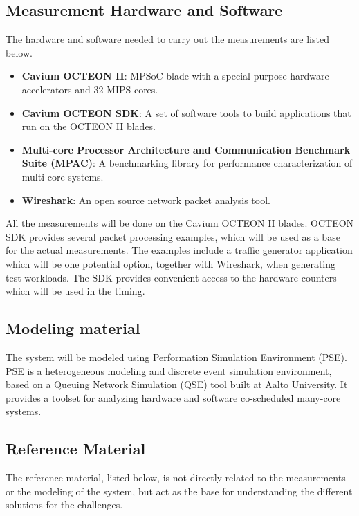 \subsection{Measurement Hardware and Software}
The hardware and software needed to carry out the measurements are listed below.

\begin{itemize}

\item \textbf{Cavium OCTEON II}: MPSoC blade with a special purpose hardware accelerators and 32 MIPS cores.
\item \textbf{Cavium OCTEON SDK}: A set of software tools to build applications that run on the OCTEON II blades.
\item \textbf{Multi-core Processor Architecture and Communication Benchmark Suite (MPAC)}: A benchmarking library for performance characterization of multi-core systems.
\item \textbf{Wireshark}: An open source network packet analysis tool.

\end{itemize}

All the measurements will be done on the Cavium OCTEON II blades. OCTEON SDK provides several packet processing examples, which will be used as a base for the actual measurements. The examples include a traffic generator application which will be one potential option, together with Wireshark, when generating test workloads. The SDK provides convenient access to the hardware counters which will be used in the timing.

\subsection{Modeling material}
The system will be modeled using Performation Simulation Environment (PSE). PSE is a heterogeneous modeling and discrete event simulation environment, based on a Queuing Network Simulation (QSE) tool built at Aalto University. It provides a toolset for analyzing hardware and software co-scheduled many-core systems.

\subsection{Reference Material}
The reference material, listed below, is not directly related to the measurements or the modeling of the system, but act as the base for understanding the different solutions for the challenges.

